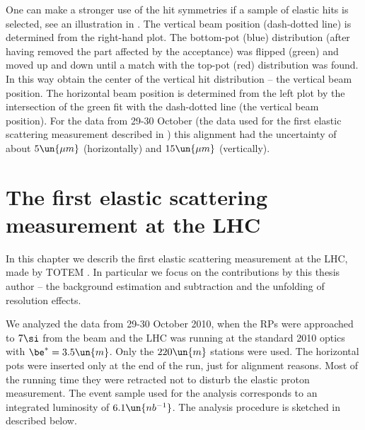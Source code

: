 One can make a stronger use of the hit symmetries if a sample of elastic hits is selected, see an illustration in . The vertical beam position (dash-dotted line) is determined from the right-hand plot. The bottom-pot (blue) distribution (after having removed the part affected by the acceptance) was flipped (green) and moved up and down until a match with the top-pot (red) distribution was found. In this way obtain the center of the vertical hit distribution -- the vertical beam position. The horizontal beam position is determined from the left plot by the intersection of the green fit with the dash-dotted line (the vertical beam position). For the data from 29-30 October (the data used for the first elastic scattering measurement described in ) this alignment had the uncertainty of about $5\un{\mu m}$ (horizontally) and $15\un{\mu m}$ (vertically).


\chapter[felm]{The first elastic scattering measurement at the LHC}

In this chapter we describ the first elastic scattering measurement at the LHC, made by TOTEM . In particular we focus on the contributions by this thesis author -- the background estimation and subtraction and the unfolding of resolution effects.


We analyzed the data from 29-30 October 2010, when the RPs were approached to $7\si$ from the beam and the LHC was running at the standard 2010 optics with $\be^* = 3.5\un{m}$. Only the $220\un{m}$ stations were used. The horizontal pots were inserted only at the end of the run, just for alignment reasons. Most of the running time they were retracted not to disturb the elastic proton measurement. The event sample used for the analysis corresponds to an integrated luminosity of $6.1\un{nb^{-1}}$. The analysis procedure is sketched in  described below.

